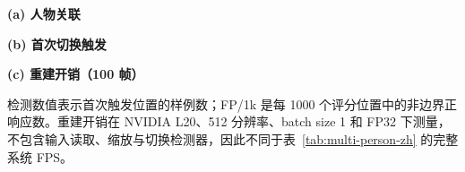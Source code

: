 \begin{table}[t]
  \centering
  \caption{人物关联准确率、镜头切换检测与受控重建开销。}
  \label{tab:boundary-analysis-zh}
  \scriptsize

  \begin{minipage}[t]{0.31\textwidth}
    \centering
    \textbf{(a) 人物关联}\par\smallskip
  \end{minipage}\hfill
  \begin{minipage}[t]{0.31\textwidth}
    \centering
    \textbf{(b) 首次切换触发}\par\smallskip
  \end{minipage}\hfill
  \begin{minipage}[t]{0.36\textwidth}
    \centering
    \textbf{(c) 重建开销（100 帧）}\par\smallskip
  \end{minipage}

  \vspace{3pt}
  \parbox{0.97\textwidth}{\footnotesize
  检测数值表示首次触发位置的样例数；FP/1k 是每 1000 个评分位置中的非边界正响应数。重建开销在 NVIDIA L20、512 分辨率、batch size 1 和 FP32 下测量，不包含输入读取、缩放与切换检测器，因此不同于表~\ref{tab:multi-person-zh} 的完整系统 FPS。}
\end{table}

